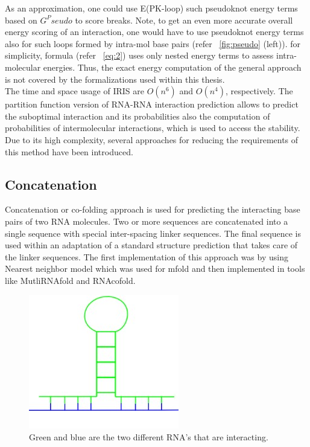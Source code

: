 \documentclass[twoside,a4paper]{report}
\begin{document}
	As an approximation, one could use E(PK-loop) such pseudoknot energy terms based on $G^Pseudo$ to score breaks. Note, to get an even more accurate overall energy scoring of an interaction, one would have to use pseudoknot energy terms also for such loops formed by intra-mol base pairs (refer ~\ref{fig:pseudo} (left)). for simplicity, formula (refer ~\ref{eq:2}) uses only nested energy terms to assess intra-molecular energies. Thus, the exact energy computation of the general approach is not covered by the formalizations used within this thesis.\\

	The time and space usage of IRIS are $ O(n^6)$ and $ O(n^4)$, respectively. The partition function version of RNA-RNA interaction prediction allows to predict the suboptimal interaction and its probabilities also the computation of probabilities of intermolecular interactions, which is used to access the stability. Due to its high complexity, several approaches for reducing the requirements of this method have been introduced.\\
	
	 
	\subsection{Concatenation}
	Concatenation or co-folding approach is used for predicting the interacting base pairs of two RNA molecules. Two or more sequences are concatenated  into a single sequence with special inter-spacing linker sequences. The final sequence is used within an adaptation of a standard structure prediction that takes  care of the linker sequences. The first implementation of this approach was by using Nearest neighbor model which was used for mfold and then implemented in tools like MutliRNAfold and RNAcofold.\\
	
	\begin{figure}[H]
		\includegraphics[width=0.3\linewidth]{concatenation}
		\centering
		\caption{ Green and blue are the two different RNA's that are interacting. } 
		\label{fig:concatenation}
	\end{figure}
	
\end{document}
